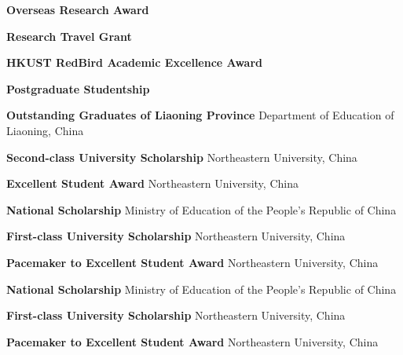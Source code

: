 %
%
%


\begin{scholarship}
	{\textbf{Overseas Research Award}}

	{\textbf{Research Travel Grant}}

	{\textbf{HKUST RedBird Academic Excellence Award}}

	{\textbf{Postgraduate Studentship}}

	{\textbf{Outstanding Graduates of Liaoning Province}}
	\scholarshipentry{}
	{Department of Education of Liaoning, China}

	{\textbf{Second-class University Scholarship}}
	\scholarshipentry{}
	{Northeastern University, China}

	{\textbf{Excellent Student Award}}
	\scholarshipentry{}
	{Northeastern University, China}

	{\textbf{National Scholarship}}
	\scholarshipentry{}
	{Ministry of Education of the People's Republic of China}

	{\textbf{First-class University Scholarship}}
	\scholarshipentry{}
	{Northeastern University, China}

	{\textbf{Pacemaker to Excellent Student Award}}
	\scholarshipentry{}
	{Northeastern University, China}

	{\textbf{National Scholarship}}
	\scholarshipentry{}
	{Ministry of Education of the People's Republic of China}

	{\textbf{First-class University Scholarship}}
	\scholarshipentry{}
	{Northeastern University, China}

	{\textbf{Pacemaker to Excellent Student Award}}
	\scholarshipentry{}
	{Northeastern University, China}
\end{scholarship}
